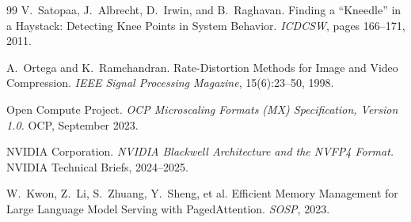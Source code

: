 \documentclass[11pt]{article}
\theoremstyle{plain}
\theoremstyle{definition}
\begin{document}
\begin{thebibliography}{99}
 V.~Satopaa, J.~Albrecht, D.~Irwin, and B.~Raghavan.
  Finding a ``Kneedle'' in a Haystack: Detecting Knee Points in System Behavior.
  \emph{ICDCSW}, pages 166--171, 2011.

 A.~Ortega and K.~Ramchandran. Rate-Distortion Methods for
  Image and Video Compression. \emph{IEEE Signal Processing Magazine},
  15(6):23--50, 1998.

 Open Compute Project. \emph{OCP Microscaling Formats (MX)
  Specification, Version 1.0.} OCP, September 2023.

 NVIDIA Corporation. \emph{NVIDIA Blackwell
  Architecture and the NVFP4 Format.} NVIDIA Technical Briefs, 2024--2025.

 W.~Kwon, Z.~Li, S.~Zhuang, Y.~Sheng, et al. Efficient Memory
  Management for Large Language Model Serving with PagedAttention. \emph{SOSP},
  2023.

\end{thebibliography}
\end{document}

